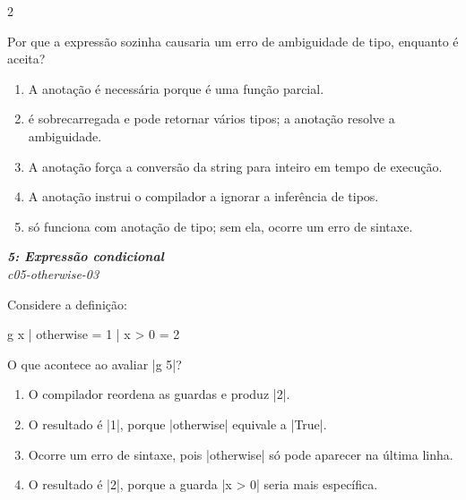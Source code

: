 \documentclass[a4paper,10pt,brazil]{article}
\begin{document}
\begin{multicols}{2}
\begin{flushright}
\end{flushright}
Por que a expressão  sozinha causaria um erro de ambiguidade de tipo, enquanto  é aceita?

\begin{enumerate}
  \item A anotação é necessária porque  é uma função parcial.

  \item {} é sobrecarregada e pode retornar vários tipos; a anotação  resolve a ambiguidade.

  \item A anotação  força a conversão da string para inteiro em tempo de execução.

  \item A anotação  instrui o compilador a ignorar a inferência de tipos.

  \item {} só funciona com anotação de tipo; sem ela, ocorre um erro de sintaxe.


\end{enumerate}

\begin{flushright}
  \footnotesize
  \textit{\textbf{5: Expressão condicional}}\\
  \textit{c05-otherwise-03}\\

\end{flushright}
Considere a definição:
\begin{haskellcode}
g x
  | otherwise = 1
  | x > 0     = 2
\end{haskellcode}
O que acontece ao avaliar \haskellinline|g 5|?

\begin{enumerate}
  \item O compilador reordena as guardas e produz \haskellinline|2|.

  \item O resultado é \haskellinline|1|, porque \haskellinline|otherwise| equivale a \haskellinline|True|.

  \item Ocorre um erro de sintaxe, pois \haskellinline|otherwise| só pode aparecer na última linha.

  \item O resultado é \haskellinline|2|, porque a guarda \haskellinline|x > 0| seria mais específica.


\end{enumerate}
\end{multicols}
\end{document}

